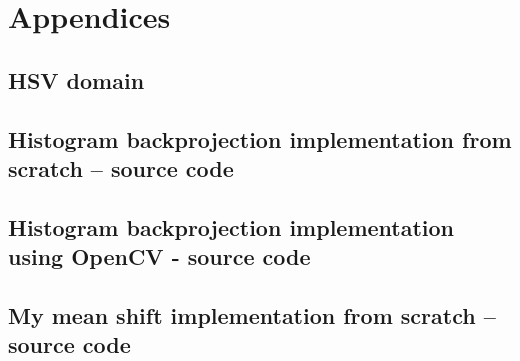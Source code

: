 \documentclass[a4paper]{article}
\begin{document}
\newpage
\appendix

\section{Appendices}

\newpage
\subsection{HSV domain}
\label{app:hsv_domain}






\newpage


\subsection{Histogram backprojection implementation from scratch -- source code}
\label{app:hist_backproj_src}




\newpage
\subsection{Histogram backprojection implementation using OpenCV - source code}
\label{app:hist_backproj_src_opencv}



\newpage
\subsection{My mean shift implementation from scratch -- source code}
\label{app:mean_shift_mine}

\end{document}
